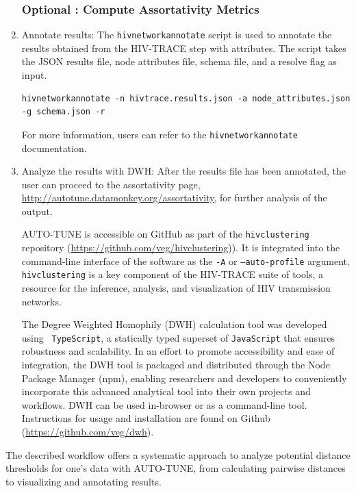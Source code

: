 \documentclass[utf8]{FrontiersinHarvard} %
\begin{document}
\begin{enumerate}
	      \subsubsection{Optional : Compute Assortativity Metrics}

	      \item{ Annotate results: The {\tt hivnetworkannotate} script is used to annotate the results obtained from the HIV-TRACE step with attributes. The script takes the JSON results file, node attributes file, schema file, and a resolve flag as input.
	                  \begin{lstlisting}[style=BashInputStyle]
hivnetworkannotate -n hivtrace.results.json -a node_attributes.json -g schema.json -r
	\end{lstlisting}
	                  For more information, users can refer to the {\tt hivnetworkannotate}
	                  documentation. }

	      \item{ Analyze the results with DWH: After the results file has been annotated, the user can proceed to the assortativity page, \url{http://autotune.datamonkey.org/assortativity}, for further analysis of the output. }

	      AUTO-TUNE is accessible on GitHub as part of the {\tt hivclustering} repository
	      (\url{https://github.com/veg/hivclustering})). It is integrated into the
	      command-line interface of the software as the {\tt -A} or {\tt --auto-profile}
	      argument. {\tt hivclustering} is a key component of the HIV-TRACE suite of
	      tools, a resource for the inference, analysis, and visualization of HIV
	      transmission networks.

	      The Degree Weighted Homophily (DWH) calculation tool was developed using {\tt
			      TypeScript}, a statically typed superset of {\tt JavaScript} that ensures
	      robustness and scalability. In an effort to promote accessibility and ease of
	      integration, the DWH tool is packaged and distributed through the Node Package
	      Manager (npm), enabling researchers and developers to conveniently incorporate
	      this advanced analytical tool into their own projects and workflows. DWH can be
	      used in-browser or as a command-line tool. Instructions for usage and
	      installation are found on Github (\url{https://github.com/veg/dwh}).

\end{enumerate}

The described workflow offers a systematic approach to analyze potential
distance thresholds for one's data with AUTO-TUNE, from calculating pairwise
distances to visualizing and annotating results.
\end{document}
